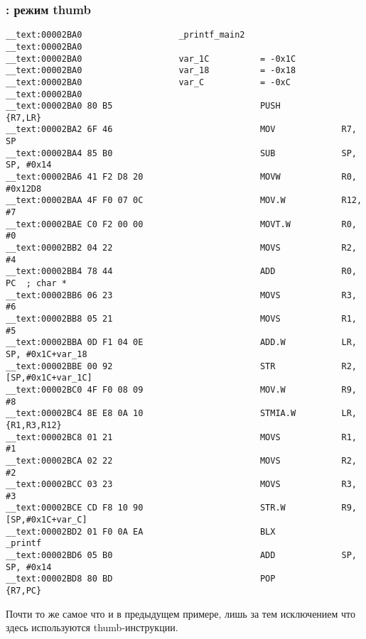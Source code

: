 \subsubsection{\OptimizingXcode: режим thumb}

\begin{lstlisting}
__text:00002BA0                   _printf_main2
__text:00002BA0
__text:00002BA0                   var_1C          = -0x1C
__text:00002BA0                   var_18          = -0x18
__text:00002BA0                   var_C           = -0xC
__text:00002BA0
__text:00002BA0 80 B5                             PUSH            {R7,LR}
__text:00002BA2 6F 46                             MOV             R7, SP
__text:00002BA4 85 B0                             SUB             SP, SP, #0x14
__text:00002BA6 41 F2 D8 20                       MOVW            R0, #0x12D8
__text:00002BAA 4F F0 07 0C                       MOV.W           R12, #7
__text:00002BAE C0 F2 00 00                       MOVT.W          R0, #0
__text:00002BB2 04 22                             MOVS            R2, #4
__text:00002BB4 78 44                             ADD             R0, PC  ; char *
__text:00002BB6 06 23                             MOVS            R3, #6
__text:00002BB8 05 21                             MOVS            R1, #5
__text:00002BBA 0D F1 04 0E                       ADD.W           LR, SP, #0x1C+var_18
__text:00002BBE 00 92                             STR             R2, [SP,#0x1C+var_1C]
__text:00002BC0 4F F0 08 09                       MOV.W           R9, #8
__text:00002BC4 8E E8 0A 10                       STMIA.W         LR, {R1,R3,R12}
__text:00002BC8 01 21                             MOVS            R1, #1
__text:00002BCA 02 22                             MOVS            R2, #2
__text:00002BCC 03 23                             MOVS            R3, #3
__text:00002BCE CD F8 10 90                       STR.W           R9, [SP,#0x1C+var_C]
__text:00002BD2 01 F0 0A EA                       BLX             _printf
__text:00002BD6 05 B0                             ADD             SP, SP, #0x14
__text:00002BD8 80 BD                             POP             {R7,PC}
\end{lstlisting}

Почти то же самое что и в  предыдущем примере, лишь за тем исключением что здесь используются thumb-инструкции.

